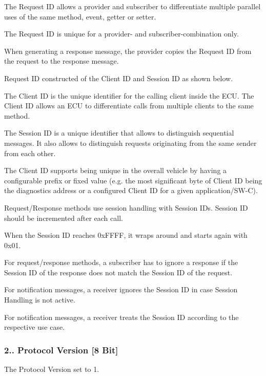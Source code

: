 \begin{DoxyItemize}
\item The Request ID allows a provider and subscriber to differentiate multiple parallel uses of the same method, event, getter or setter.
\item The Request ID is unique for a provider-\/ and subscriber-\/combination only.
\item When generating a response message, the provider copies the Request ID from the request to the response message.
\item Request ID constructed of the Client ID and Session ID as shown below. 
\item The Client ID is the unique identifier for the calling client inside the E\+CU. The Client ID allows an E\+CU to differentiate calls from multiple clients to the same method.
\item The Session ID is a unique identifier that allows to distinguish sequential messages. It also allows to distinguish requests originating from the same sender from each other.
\item The Client ID supports being unique in the overall vehicle by having a configurable prefix or fixed value (e.\+g. the most significant byte of Client ID being the diagnostics address or a configured Client ID for a given application/\+S\+W-\/C). 
\item Request/\+Response methods use session handling with Session I\+Ds. Session ID should be incremented after each call.
\item When the Session ID reaches 0x\+F\+F\+FF, it wraps around and starts again with 0x01.
\item For request/response methods, a subscriber has to ignore a response if the Session ID of the response does not match the Session ID of the request.
\item For notification messages, a receiver ignores the Session ID in case Session Handling is not active.
\item For notification messages, a receiver treats the Session ID according to the respective use case.
\end{DoxyItemize}

\subsubsection*{2.. Protocol Version \mbox{[}8 Bit\mbox{]}}


\begin{DoxyItemize}
\item The Protocol Version set to 1.
\end{DoxyItemize}

